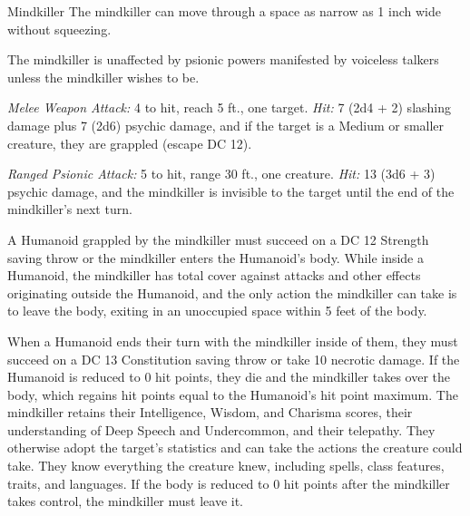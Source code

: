 \documentclass[10pt,a4paper,twoside,bg=print,twocolumn,openany,nodeprecatedcode]{dndbook}
\begin{document}
\begin{DndMonster}[float=t]{Mindkiller}
\DndMonsterBasics[
armor-class = {12},
hit-points = {\DndDice{10d6 + 10}},
speed = {10 ft., fly 30 ft.}
]
\DndMonsterAbilityScores[
 str = 14,
 dex = 15,
 con = 12,
 int = 16,
 wis = 15,
 cha = 14
]
\DndMonsterDetails[
skills = {Deception +4, Stealth +4},
senses = {darkvision 120 ft., passive perception 12},
languages = {Deep Speech, Undercommon, telepathy 120 ft.},
challenge = 2,
]
The mindkiller can move through a space as narrow as 1 inch wide without squeezing.

The mindkiller is unaffected by psionic powers manifested by voiceless talkers unless the mindkiller wishes to be.

\textsl{Melee Weapon Attack:} 4 to hit, reach 5 ft., one target. \textsl{Hit:} 7 (2d4 + 2) slashing damage plus 7 (2d6) psychic damage, and if the target is a Medium or smaller creature, they are grappled (escape DC 12).

\textsl{Ranged Psionic Attack:} 5 to hit, range 30 ft., one creature. \textsl{Hit:} 13 (3d6 + 3) psychic damage, and the mindkiller is invisible to the target until the end of the mindkiller's next turn.

A Humanoid grappled by the mindkiller must succeed on a DC 12 Strength saving throw or the mindkiller enters the Humanoid's body. While inside a Humanoid, the mindkiller has total cover against attacks and other effects originating outside the Humanoid, and the only action the mindkiller can take is to leave the body, exiting in an unoccupied space within 5 feet of the body.

When a Humanoid ends their turn with the mindkiller inside of them, they must succeed on a DC 13 Constitution saving throw or take 10 necrotic damage. If the Humanoid is reduced to 0 hit points, they die and the mindkiller takes over the body, which regains hit points equal to the Humanoid's hit point maximum. The mindkiller retains their Intelligence, Wisdom, and Charisma scores, their understanding of Deep Speech and Undercommon, and their telepathy. They otherwise adopt the target's statistics and can take the actions the creature could take. They know everything the creature knew, including spells, class features, traits, and languages. If the body is reduced to 0 hit points after the mindkiller takes control, the mindkiller must leave it.


\end{DndMonster}
\end{document}

